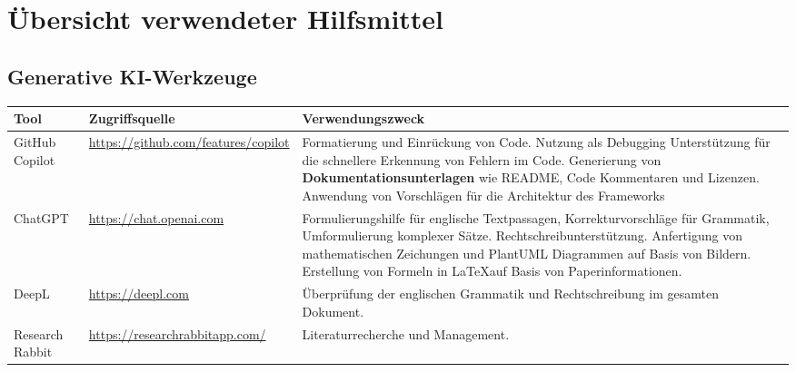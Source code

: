 \chapter*{Übersicht verwendeter Hilfsmittel}
\thispagestyle{plain}

\section*{Generative KI-Werkzeuge}

\begin{tabular}{p{3cm}p{5cm}p{7cm}}
  \textbf{Tool}   & \textbf{Zugriffsquelle}                   & \textbf{Verwendungszweck}                                                                                                                                                                                                                  \\
  \hline
  GitHub Copilot  & \url{https://github.com/features/copilot} &
  Formatierung und Einrückung von Code. Nutzung als Debugging Unterstützung für die schnellere Erkennung von Fehlern im Code. Generierung von \textbf{Dokumentationsunterlagen} wie README, Code Kommentaren und Lizenzen. Anwendung von Vorschlägen für die Architektur des Frameworks                    \\
  \hline
  ChatGPT         & \url{https://chat.openai.com}             &
  Formulierungshilfe für englische Textpassagen, Korrekturvorschläge für Grammatik, Umformulierung komplexer Sätze. Rechtschreibunterstützung. Anfertigung von mathematischen Zeichungen und PlantUML Diagrammen auf Basis von Bildern. Erstellung von Formeln in \LaTeX auf Basis von Paperinformationen. \\
  \hline
  DeepL           & \url{https://deepl.com}                   &
  Überprüfung der englischen Grammatik und Rechtschreibung im gesamten Dokument.                                                                                                                                                                                                                           \\
  \hline
  Research Rabbit & \url{https://researchrabbitapp.com/}      &
  Literaturrecherche und Management.                                                                                                                                                                                                                                                                       \\
  \hline
\end{tabular}

